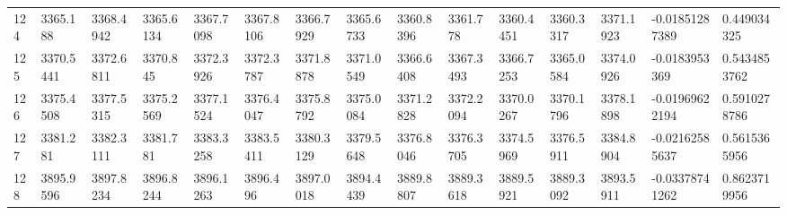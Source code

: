 \begin{landscape}
{\begin{longtable}{@{}lllllllllllllll@{}}
		124                                          & 3365.188                 & 3368.4942                & 3365.6134                & 3367.7098                & 3367.8106                & 3366.7929                & 3365.6733                & 3360.8396                & 3361.778                 & 3360.4451                & 3360.3317                & 3371.1923                & -0.01851287389                                                         & 0.449034325                                     \\
		125                                          & 3370.5441                & 3372.6811                & 3370.845                 & 3372.3926                & 3372.3787                & 3371.8878                & 3371.0549                & 3366.6408                & 3367.3493                & 3366.7253                & 3365.0584                & 3374.0926                & -0.0183953369                                                          & 0.5434853762                                    \\
		126                                          & 3375.4508                & 3377.5315                & 3375.2569                & 3377.1524                & 3376.4047                & 3375.8792                & 3375.0084                & 3371.2828                & 3372.2094                & 3370.0267                & 3370.1796                & 3378.1898                & -0.01969622194                                                         & 0.5910278786                                    \\
		127                                          & 3381.281                 & 3382.3111                & 3381.781                 & 3383.3258                & 3383.5411                & 3380.3129                & 3379.5648                & 3376.8046                & 3376.3705                & 3374.5969                & 3376.5911                & 3384.8904                & -0.02162585637                                                         & 0.5615365956                                    \\
		128                                          & 3895.9596                & 3897.8234                & 3896.8244                & 3896.1263                & 3896.496                 & 3897.0018                & 3894.4439                & 3889.8807                & 3889.3618                & 3889.5921                & 3889.3092                & 3893.5911                & -0.03378741262                                                         & 0.8623719956                                    \\

\end{longtable}}
\end{landscape}

